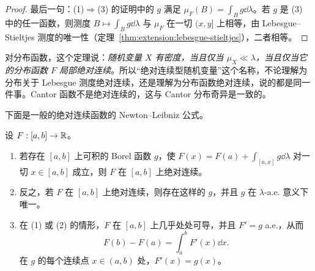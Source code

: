 \begin{proof}
最后一句：(1)$\Rightarrow$(3) 的证明中的 $g$ 满足 $\mu_F(B)=\int_Bg\dd\lambda$。若 $g$ 是 (3) 中的任一函数，则测度 $B\mapsto\int_Bg\dd\lambda$ 与 $\mu_F$ 在一切 $(x,y]$ 上相等，由 Lebesgue--Stieltjes 测度的唯一性（定理~\ref{thm:extension:lebesgue-stieltjes}），二者相等。
\end{proof}

对分布函数，这个定理说：\emph{随机变量 $X$ 有密度，当且仅当 $\mu_X\ll\lambda$，当且仅当它的分布函数 $F$ 局部绝对连续}。所以“绝对连续型随机变量”这个名称，不论理解为分布关于 Lebesgue 测度绝对连续，还是理解为分布函数绝对连续，说的都是同一件事。Cantor 函数不是绝对连续的，这与 Cantor 分布奇异是一致的。

下面是一般的绝对连续函数的 Newton--Leibniz 公式。

\begin{theorem}\label{thm:ac:newton-leibniz}
设 $F:[a,b]\to\mathbb{R}$。
\begin{enumerate}
\item 若存在 $[a,b]$ 上可积的 Borel 函数 $g$，使 $F(x)=F(a)+\int_{[a,x]}g\dd\lambda$ 对一切 $x\in[a,b]$ 成立，则 $F$ 在 $[a,b]$ 上绝对连续。
\item 反之，若 $F$ 在 $[a,b]$ 上绝对连续，则存在这样的 $g$，并且 $g$ 在 $\lambda$-a.e. 意义下唯一。
\item 在 (1) 或 (2) 的情形，$F$ 在 $[a,b]$ 上几乎处处可导，并且 $F'=g$ a.e.，从而
\[
F(b)-F(a)=\int_a^bF'(x)\dd x .
\]
在 $g$ 的每个连续点 $x\in(a,b)$ 处，$F'(x)=g(x)$。
\end{enumerate}
\end{theorem}
